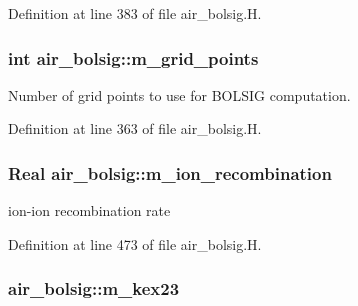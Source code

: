 Definition at line 383 of file air\+\_\+bolsig.\+H.

\subsubsection[{\texorpdfstring{m\+\_\+grid\+\_\+points}{m_grid_points}}]{\setlength{\rightskip}{0pt plus 5cm}int air\+\_\+bolsig\+::m\+\_\+grid\+\_\+points\hspace{0.3cm}{\ttfamily [protected]}}\hypertarget{classair__bolsig_af2afe8417302ebb38b9584b361014160}{}\label{classair__bolsig_af2afe8417302ebb38b9584b361014160}


Number of grid points to use for B\+O\+L\+S\+IG computation. 



Definition at line 363 of file air\+\_\+bolsig.\+H.

\subsubsection[{\texorpdfstring{m\+\_\+ion\+\_\+recombination}{m_ion_recombination}}]{\setlength{\rightskip}{0pt plus 5cm}Real air\+\_\+bolsig\+::m\+\_\+ion\+\_\+recombination\hspace{0.3cm}{\ttfamily [protected]}}\hypertarget{classair__bolsig_a439659d260a21164d5a30c2b5e6b7fa7}{}\label{classair__bolsig_a439659d260a21164d5a30c2b5e6b7fa7}


ion-\/ion recombination rate 



Definition at line 473 of file air\+\_\+bolsig.\+H.

\subsubsection[{\texorpdfstring{m\+\_\+kex23}{m_kex23}}]{ air\+\_\+bolsig\+::m\+\_\+kex23\hspace{0.3cm}{\ttfamily [protected]}}\hypertarget{classair__bolsig_a8884012c873197f7521baf52835c8dd4}{}\label{classair__bolsig_a8884012c873197f7521baf52835c8dd4}


